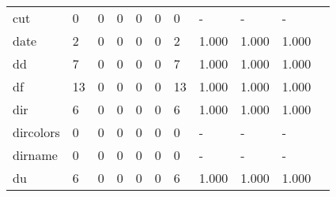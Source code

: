 \begin{longtable}{lp{1.10cm}p{1.10cm}p{1.10cm}p{1.10cm}p{1.10cm}p{1.10cm}p{1.10cm}p{1.10cm}p{1.10cm}p{1.10cm}}
cut       &                      0 &                                  0 &                                 0 &                                0 &                                 0 &                               0 &                              - &                                     - &                                   - \\
date      &                      2 &                                  0 &                                 0 &                                0 &                                 0 &                               2 &                          1.000 &                                 1.000 &                               1.000 \\
dd        &                      7 &                                  0 &                                 0 &                                0 &                                 0 &                               7 &                          1.000 &                                 1.000 &                               1.000 \\
df        &                     13 &                                  0 &                                 0 &                                0 &                                 0 &                              13 &                          1.000 &                                 1.000 &                               1.000 \\
dir       &                      6 &                                  0 &                                 0 &                                0 &                                 0 &                               6 &                          1.000 &                                 1.000 &                               1.000 \\
dircolors &                      0 &                                  0 &                                 0 &                                0 &                                 0 &                               0 &                              - &                                     - &                                   - \\
dirname   &                      0 &                                  0 &                                 0 &                                0 &                                 0 &                               0 &                              - &                                     - &                                   - \\
du        &                      6 &                                  0 &                                 0 &                                0 &                                 0 &                               6 &                          1.000 &                                 1.000 &                               1.000 \\

\end{longtable}
